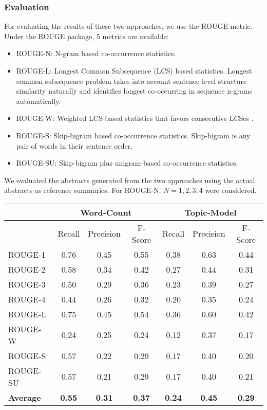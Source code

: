 \subsubsection{Evaluation}
For evaluating the results of these two approaches, we use the ROUGE metric\cite{lin2004rouge}. Under the ROUGE package, 5 metrics are available:
\begin{itemize}
\item ROUGE-N: N-gram based co-occurrence statistics.
\item ROUGE-L: Longest Common Subsequence (LCS) based statistics. Longest common subsequence problem takes into account sentence level structure similarity naturally and identifies longest co-occurring in sequence n-grams automatically.
\item ROUGE-W: Weighted LCS-based statistics that favors consecutive LCSes .
\item ROUGE-S: Skip-bigram based co-occurrence statistics. Skip-bigram is any pair of words in their sentence order.
\item ROUGE-SU: Skip-bigram plus unigram-based co-occurrence statistics.
\end{itemize}
We evaluated the abstracts generated from the two approaches using the actual abstracts as reference summaries. For ROUGE-N, $N = 1,2,3,4$ were considered. 
\newpage

\begin{table}[H]

\label{my-label}
\begin{tabular}{|l|c|c|c|c|c|c|}
\hline 
 & \multicolumn{3}{c|}{Word-Count} & \multicolumn{3}{c|}{Topic-Model} \\
 \hline 
& Recall & Precision      &  F-Score    & Recall     & Precision      &  F-Score           \\
 \hline 
 ROUGE-1&   0.76    &  0.45     &  0.55    &  0.38     &   0.63    &  0.44    \\
 \hline
 ROUGE-2&   0.58    &  0.34     & 0.42     &    0.27   &   0.44    &   0.31   \\
 \hline
 ROUGE-3&    0.50   &   0.29    &  0.36    &   0.23    &  0.39     &  0.27    \\
 \hline
 ROUGE-4&   0.44    &  0.26     &  0.32    &   0.20    &   0.35    &  0.24   \\
 \hline
 ROUGE-L&   0.75    &  0.45     & 0.54     &     0.36  &  0.60    &  0.42    \\
 \hline
 ROUGE-W&    0.24   &  0.25     &  0.24    &    0.12   &   0.37    &    0.17  \\
 \hline
 ROUGE-S&   0.57    &  0.22     &   0.29   &    0.17   &   0.40    &  0.20    \\
 \hline
 ROUGE-SU&  0.57     &   0.21    &   0.29   &   0.17    &    0.40   & 0.21  \\ 
 \hline 
 \textbf{Average} &\textbf{0.55}&\textbf{0.31}&\textbf{0.37}&\textbf{0.24}&\textbf{0.45}&\textbf{0.29} \\
 \hline
\end{tabular}
\end{table}

